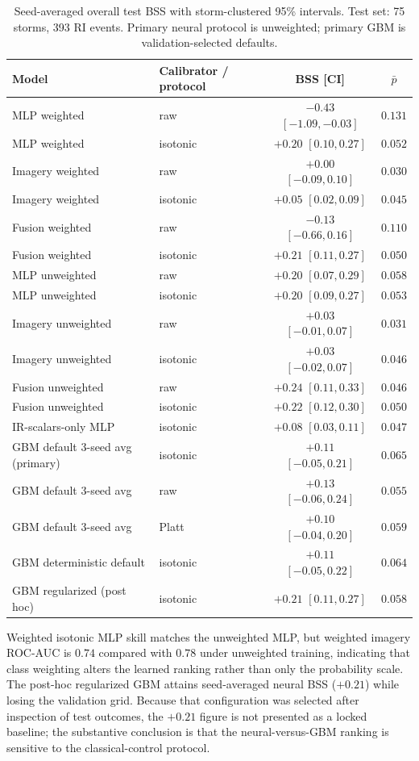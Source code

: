 \documentclass[11pt]{article}
\begin{document}
\begin{table}[H]
\centering
\caption{Seed-averaged overall test BSS with storm-clustered 95\% intervals. Test set: 75 storms, 393 RI events. Primary neural protocol is unweighted; primary GBM is validation-selected defaults.}
\label{tab:main}
\begin{tabular}{llcc}
\toprule
Model & Calibrator / protocol & BSS [CI] & $\bar p$ \\
\midrule
MLP weighted & raw & $-0.43$ $[-1.09,-0.03]$ & $0.131$ \\
MLP weighted & isotonic & $+0.20$ $[0.10,0.27]$ & $0.052$ \\
Imagery weighted & raw & $+0.00$ $[-0.09,0.10]$ & $0.030$ \\
Imagery weighted & isotonic & $+0.05$ $[0.02,0.09]$ & $0.045$ \\
Fusion weighted & raw & $-0.13$ $[-0.66,0.16]$ & $0.110$ \\
Fusion weighted & isotonic & $+0.21$ $[0.11,0.27]$ & $0.050$ \\
\midrule
MLP unweighted & raw & $+0.20$ $[0.07,0.29]$ & $0.058$ \\
MLP unweighted & isotonic & $+0.20$ $[0.09,0.27]$ & $0.053$ \\
Imagery unweighted & raw & $+0.03$ $[-0.01,0.07]$ & $0.031$ \\
Imagery unweighted & isotonic & $+0.03$ $[-0.02,0.07]$ & $0.046$ \\
Fusion unweighted & raw & $+0.24$ $[0.11,0.33]$ & $0.046$ \\
Fusion unweighted & isotonic & $+0.22$ $[0.12,0.30]$ & $0.050$ \\
IR-scalars-only MLP & isotonic & $+0.08$ $[0.03,0.11]$ & $0.047$ \\
\midrule
GBM default 3-seed avg (primary) & isotonic & $+0.11$ $[-0.05,0.21]$ & $0.065$ \\
GBM default 3-seed avg & raw & $+0.13$ $[-0.06,0.24]$ & $0.055$ \\
GBM default 3-seed avg & Platt & $+0.10$ $[-0.04,0.20]$ & $0.059$ \\
GBM deterministic default & isotonic & $+0.11$ $[-0.05,0.22]$ & $0.064$ \\
GBM regularized (post hoc) & isotonic & $+0.21$ $[0.11,0.27]$ & $0.058$ \\
\bottomrule
\end{tabular}
\end{table}

Weighted isotonic MLP skill matches the unweighted MLP, but weighted imagery ROC-AUC is $0.74$ compared with $0.78$ under unweighted training, indicating that class weighting alters the learned ranking rather than only the probability scale. The post-hoc regularized GBM attains seed-averaged neural BSS ($+0.21$) while losing the validation grid. Because that configuration was selected after inspection of test outcomes, the $+0.21$ figure is not presented as a locked baseline; the substantive conclusion is that the neural-versus-GBM ranking is sensitive to the classical-control protocol.
\end{document}

